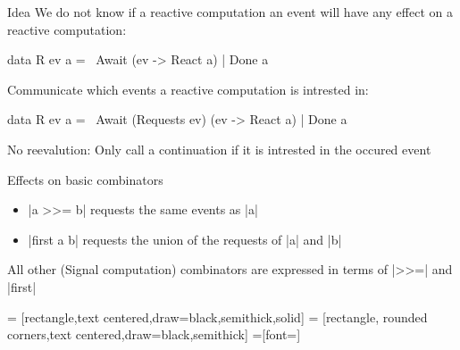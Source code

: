 \documentclass{beamer}
\begin{document}
\begin{frame}{Idea}
We do not know if a reactive computation an event will have any effect on a reactive computation:
\begin{code}
data R ev a  =~  Await (ev -> React a) 
             |   Done a
\end{code}
\pause
Communicate which events a reactive computation is intrested in:
\begin{code}
data R ev a  =~  Await (Requests ev) (ev -> React a) 
             |   Done a
\end{code}
No reevalution: Only call a continuation if it is intrested in the occured event

\end{frame}

\begin{frame}{Effects on basic combinators}

\begin{itemize}
\item |a >>= b| requests the same events as |a|
\item |first a b| requests the union of the requests of |a| and |b| 
\end{itemize}
All other (Signal computation) combinators are expressed in terms of |>>=| and |first|

\end{frame}

\centering
{} = [rectangle,text centered,draw=black,semithick,solid]
 = [rectangle, rounded corners,text centered,draw=black,semithick]
 =[font=\small]
\end{document}
